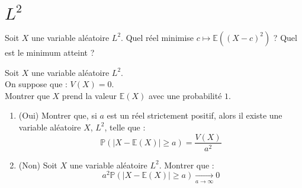 \section{$L^2$}

\begin{exer}
Soit $X$ une variable al\'eatoire $L^2$. Quel r\'eel minimise $c\mapsto\mathbb{E}((X-c)^2)$ ? Quel est le minimum atteint ?
\end{exer}

\begin{exer}
Soit $X$ une variable al\'eatoire $L^2$.\\
On suppose que : $V(X)=0$.\\
Montrer que $X$ prend la valeur $\mathbb{E}(X)$ avec une probabilit\'e $1$.
\end{exer}

\begin{exer}
\begin{enumerate}
\item (Oui) Montrer que, si $a$ est un r\'eel strictement positif, alors il existe une variable al\'eatoire $X$, $L^2$, telle que :\[\mathbb{P}(|X-\mathbb{E}(X)|\geq a)=\frac{V(X)}{a^2}\]
\item (Non) Soit $X$ une variable al\'eatoire $L^2$. Montrer que : \[a^2\mathbb{P}(|X-\mathbb{E}(X)|\geq a)\underset{a\rightarrow\infty}{\rightarrow}0\]
\end{enumerate}
\end{exer}